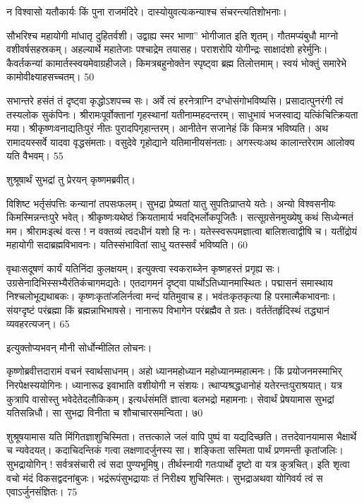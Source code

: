   न विश्वासो यतौकार्यः किं पुना राजमंदिरे।
 दास्योयुवत्यःकन्याश्च संचरन्त्यतिशोभनाः।
 
सौभरिश्च महायोगी मांधातृ दुहितर्वशी।
 उद्वाह्य स्मर भाणा” भोगीजात इति शृतम्।
 गौतमप्यंबुधौ माग्नो वशीवर्षसहस्रकम्।
 अहल्यार्थे महातेजाः पश्चाद्रेम तयासह।
 पराशरोपि योगीन्द्रः साक्षादंशो हरेर्मुनिः।
 कैवर्तकन्यां कामार्तस्स्वयमेवाग्रहीजले।
 किमत्रबहुनोक्तेन स्पृष्ट्वा ब्रह्म तिलोत्तमाम्।
 स्वयं भोक्तुं समारेभे कामोवीक्ष्याहसच्चतम्।
 50

  सभान्तरे हसंतं तं दृष्ट्वा कृद्धोऽशपच्च सः।
 अर्वे त्वं हरनेत्राग्नि दग्धोसंगोभविष्यसि।
 प्रसादात्पुनरंगी त्वं तस्यलोक सुकंपिनः।
 श्रीरामःपूर्वोक्तानां गृहस्थानां यतीनाम्महदन्तरम्।
 साधुभावं भजस्वाद्य यत्किंचित्क्रियता मया।
 श्रीकृष्णःवनाद्यतिःपुरं नीतः पुरादपिगृहान्तरम्।
 आनीतेन सजानेहं किं किमत्र भविष्यति।
 अथ रामादयस्सर्वे यादवा वृद्धसंमताः।
 वसुदेवे गृहोद्याने यतिमानीयसंनताः।
 अगस्त्यःअथ कालान्तरेराम आलोक्य यति वैभवम्।
 55

  शुश्रूषार्थं सुभद्रां तु प्रेरयन् कृष्णमब्रवीत्।

विशिष्ट भर्तृसंपत्तिः कन्यानां तपसःफलम्।
 सुभद्रा प्रेष्यतां यातु सुपतिःप्राप्तये यतेः।
 अन्यो विश्वसनीयः किमस्मिन्नन्तःपुरे भवेत्।
 श्रीकृष्णःयथेष्ठं क्रियतामार्य भवद्भिर्लोकपूजितैः।
 सत्सूग्रसेनमुख्येषु कथं सिध्येन्मतं मम।
 श्रीरामःइत्थं वत्स ! न वक्तव्यं त्वदधीनं यशो हि नः।
 यतेस्स्वरूपमज्ञात्वा बालिशत्वाद्वीषि च।
 यतींद्रोयं महायोगी सदाब्रह्मविभावनः।
 यतिस्संभावितां साधु यतस्सर्वं भविष्यति।
 60

  वृथाःसदूषणं कार्यं यतिनिंदा कुलक्षयम्।
 इत्युक्त्वा स्वकराब्जेन कृष्णहस्तं प्रगृह्य सः।
 उग्रसेनादिभिस्सभ्यैरंतिकंचागमद्यतेः।
 एतदागमनं दृष्ट्वा पार्थोऽतिध्यानमास्थितः।
 पद्मासनं समास्थाय निश्चलोभूद्यथाबकः।
 कृष्णःकृतांजलिर्नत्वा मन्दं यतिमुवाच ह।
 भवंतःकृतकृत्या हि परमात्मैकभावनाः।
 संयग्दृष्टं परंब्रह्मा किं ब्रह्मन्नाभिभाषसे।
 नानारूप विभागेन परंब्रह्मैव ते ग्रतः।
 वर्ततेंतर्हृदिस्थं तद्ध्यानं व्यवहरत्यजन्।
 65

  इत्युक्तोप्यभवन् मौनी सोर्धोन्मीलित लोचनः।

कृष्णोब्रवीत्तदारामं वचनं स्वार्थसाधनम्।
 अहो ध्यानमहोध्यान महोध्यानम्महात्मनः।
 किं प्रयोजनमस्माभिर् निरपेक्षस्ययोगिनः।
 ध्यानारूढ इवाभाति वशीयोगी न संशयः।
 त्थाप्यश्रद्धधानोहं यतेरन्तःपुराश्रयात्।
 यत्र कुत्रापि वासोस्तु भवेदेतेदलौकिकम्।
 इत्यर्धसंमतिं ज्ञात्वा बलभद्रो महामनाः।
 सेवार्थं प्रेषयामास सुभद्रां यतिसन्निधौ।
 सा सुभद्रा विनीता च शौचाचारसमन्विता।
 ७0

  शुश्रूषयामास यति मिंगितज्ञाशुचिस्मिता।
 तत्तत्काले जलं वापि पुष्पं वा यद्यदिच्छति।
 तत्तदेवानयामास भैक्षार्थे च न्यवेदयत्।
 कदाचिदन्तिकं गत्वा लक्षणादर्जुनस्य सा।
 शङ्किता सस्मिता पार्थं प्रणमन्ती कृतांजलिः।
 सुभद्रायोगिन् ! सर्वत्रसंचारी त्वं सदा पुण्यभूमिषु।
 तीर्थस्नायी गतःपार्थो दृष्टो वा यत्र कुत्रचित्।
 इति शृत्वा वचो मंदं विकसद्वदनांबुजः।
 भद्रंरूपंसुभद्रायाः तं निरीक्ष्य शुचिस्मितः।
 सुभद्राअथवा योगिवर्य त्वं स एवाऽर्जुनसंज्ञितः।
 75

